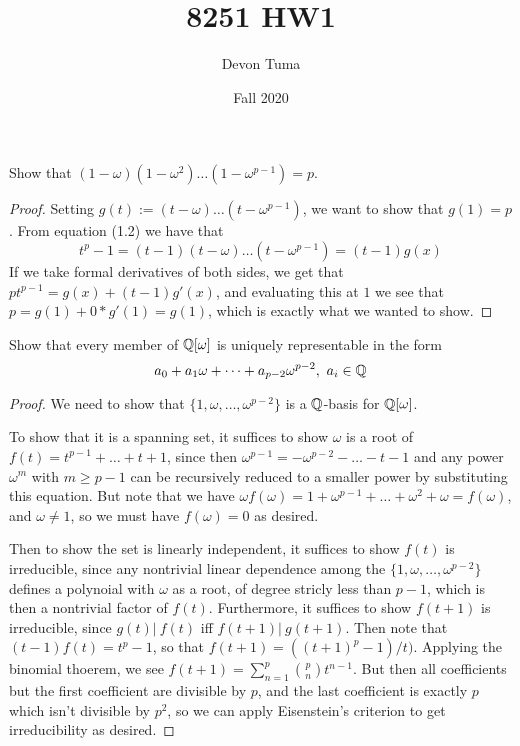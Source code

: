 \documentclass[11pt]{article}
\title{8251 HW1}
\author{Devon Tuma}
\date{Fall 2020}
\begin{document}
\maketitle

Show that $(1 - \omega)(1 - \omega^2)\dots(1 - \omega^{p-1}) = p$.

\begin{proof}
  Setting $g(t) := (t - \omega)\dots(t - \omega^{p-1})$, we want to show that $g(1) = p$.
  From equation (1.2) we have that
  \begin{equation*}
    t^p - 1 = (t - 1)(t - \omega)\dots(t - \omega^{p-1}) = (t-1)g(x)
  \end{equation*}
  If we take formal derivatives of both sides, we get that $pt^{p-1} = g(x) + (t-1)g'(x)$, and evaluating this at $1$ we see that $p = g(1) + 0 * g'(1) = g(1)$, which is exactly what we wanted to show.
\end{proof}


Show that every member of $\mathbb{Q}[\omega]$ is uniquely representable in the form $$a_0 + a_1\omega + \dots + a_{p-2}\omega^{p-2}, \ a_i \in \mathbb{Q}$$

\begin{proof}
  We need to show that $\{1, \omega, \dots, \omega^{p-2}\}$ is a $\mathbb{Q}$-basis for $\mathbb{Q}[\omega]$.
  
  To show that it is a spanning set, it suffices to show $\omega$ is a root of $f(t) = t^{p-1} + \dots + t + 1$, since then $\omega^{p-1} = -\omega^{p-2}-\dots-t-1$ and any power $\omega^m$ with $m \ge p - 1$ can be recursively reduced to a smaller power by substituting this equation.
  But note that we have $\omega f(\omega) = 1 + \omega^{p-1} + \dots + \omega^2 + \omega = f(\omega)$, and $\omega \ne 1$, so we must have $f(\omega) = 0$ as desired.

  Then to show the set is linearly independent, it suffices to show $f(t)$ is irreducible, since any nontrivial linear dependence among the $\{1, \omega, \dots, \omega^{p-2}\}$ defines a polynoial with $\omega$ as a root, of degree stricly less than $p-1$, which is then a nontrivial factor of $f(t)$.
  Furthermore, it suffices to show $f(t+1)$ is irreducible, since $g(t) |\ f(t)$ iff $f(t+1) |\ g(t+1)$. Then note that $(t-1)f(t) = t^p - 1$, so that $f(t+1) = ((t+1)^p - 1) / t)$.
  Applying the binomial thoerem, we see $f(t+1) = \sum_{n = 1}^p \binom{p}{n} t^{n-1}$.
  But then all coefficients but the first coefficient are divisible by $p$, and the last coefficient is exactly $p$ which isn't divisible by $p^2$, so we can apply Eisenstein's criterion to get irreducibility as desired.
\end{proof}
\end{document}

